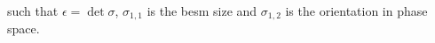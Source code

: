 \noindent such that \(\epsilon = \det\sigma\), \(\sigma_{1,1}\) is the besm size
and \(\sigma_{1,2}\) is the orientation in phase space.




